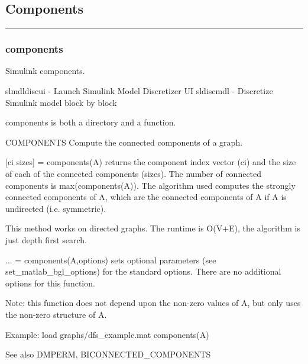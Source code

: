 \subsection*{Components}
\vspace{1cm}
\hrule
\subsubsection*{components}
\begin{mcode}
  Simulink components.
 
  slmdldiscui   - Launch Simulink Model Discretizer UI
  sldiscmdl     - Discretize Simulink model block by block 


components is both a directory and a function.

  COMPONENTS Compute the connected components of a graph.
 
  [ci sizes] = components(A) returns the component index vector (ci) and
  the size of each of the connected components (sizes).  The number of
  connected components is max(components(A)).  The algorithm used computes
  the strongly connected components of A, which are the connected
  components of A if A is undirected (i.e. symmetric).  
 
  This method works on directed graphs.
  The runtime is O(V+E), the algorithm is just depth first search.
 
  ... = components(A,options) sets optional parameters (see 
  set_matlab_bgl_options) for the standard options.
    There are no additional options for this function.
 
  Note: this function does not depend upon the non-zero values of A, but
  only uses the non-zero structure of A.
 
  Example: 
     load graphs/dfs_example.mat
     components(A)
 
  See also DMPERM, BICONNECTED_COMPONENTS
\end{mcode}
\newpage
